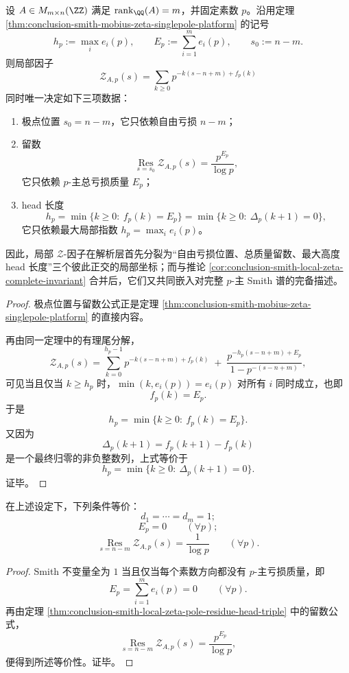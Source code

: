 \begin{theorem}\label{thm:conclusion-smith-local-zeta-pole-residue-head-triple}
设 \(A\in M_{m\times n}(\ZZ)\) 满足 \(\operatorname{rank}_{\QQ}(A)=m\)，并固定素数 \(p\)。沿用定理 \ref{thm:conclusion-smith-mobius-zeta-singlepole-platform} 的记号
\[
h_p:=\max_i e_i(p),
\qquad
E_p:=\sum_{i=1}^{m}e_i(p),
\qquad
s_0:=n-m.
\]
则局部因子
\[
\mathcal Z_{A,p}(s)
=
\sum_{k\ge 0}p^{-k(s-n+m)+f_p(k)}
\]
同时唯一决定如下三项数据：
\begin{enumerate}
  \item 极点位置 \(s_0=n-m\)，它只依赖自由亏损 \(n-m\)；
  \item 留数
  \[
  \operatorname*{Res}_{s=s_0}\mathcal Z_{A,p}(s)=\frac{p^{E_p}}{\log p},
  \]
  它只依赖 \(p\)-主总亏损质量 \(E_p\)；
  \item head 长度
  \[
  h_p=\min\{k\ge 0:\ f_p(k)=E_p\}
  =\min\{k\ge 0:\ \Delta_p(k+1)=0\},
  \]
  它只依赖最大局部指数 \(h_p=\max_i e_i(p)\)。
\end{enumerate}
因此，局部 \(\mathcal Z\)-因子在解析层首先分裂为“自由亏损位置、总质量留数、最大高度 head 长度”三个彼此正交的局部坐标；而与推论 \ref{cor:conclusion-smith-local-zeta-complete-invariant} 合并后，它们又共同嵌入对完整 \(p\)-主 Smith 谱的完备描述。
\end{theorem}
\begin{proof}
极点位置与留数公式正是定理 \ref{thm:conclusion-smith-mobius-zeta-singlepole-platform} 的直接内容。

再由同一定理中的有理尾分解，
\[
\mathcal Z_{A,p}(s)
=
\sum_{k=0}^{h_p-1}p^{-k(s-n+m)+f_p(k)}
\;+\;
\frac{p^{-h_p(s-n+m)+E_p}}{1-p^{-(s-n+m)}},
\]
可见当且仅当 \(k\ge h_p\) 时，\(\min(k,e_i(p))=e_i(p)\) 对所有 \(i\) 同时成立，也即
\[
f_p(k)=E_p.
\]
于是
\[
h_p=\min\{k\ge 0:\ f_p(k)=E_p\}.
\]
又因为
\[
\Delta_p(k+1)=f_p(k+1)-f_p(k)
\]
是一个最终归零的非负整数列，上式等价于
\[
h_p=\min\{k\ge 0:\ \Delta_p(k+1)=0\}.
\]
证毕。
\end{proof}

\begin{corollary}\label{cor:conclusion-smith-unimodular-residue-rigidity}
在上述设定下，下列条件等价：
\[
d_1=\cdots=d_m=1;
\]
\[
E_p=0
\qquad(\forall p);
\]
\[
\operatorname*{Res}_{s=n-m}\mathcal Z_{A,p}(s)=\frac{1}{\log p}
\qquad(\forall p).
\]
\end{corollary}
\begin{proof}
Smith 不变量全为 \(1\) 当且仅当每个素数方向都没有 \(p\)-主亏损质量，即
\[
E_p=\sum_{i=1}^{m}e_i(p)=0
\qquad(\forall p).
\]
再由定理 \ref{thm:conclusion-smith-local-zeta-pole-residue-head-triple} 中的留数公式，
\[
\operatorname*{Res}_{s=n-m}\mathcal Z_{A,p}(s)=\frac{p^{E_p}}{\log p},
\]
便得到所述等价性。证毕。
\end{proof}

